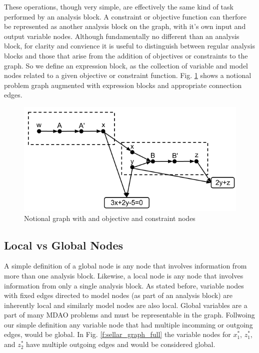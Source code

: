 These operations, though very simple, are effectively the same kind of task 
performed by an analysis block. A constraint or objective function can therfore 
be represented as another analysis block on the graph, with it's own input and 
output variable nodes. Although fundamentally no different than an analysis block, 
for clarity and convience it is useful to distinguish between regular analysis 
blocks and those that arise from the addition of objectives or constraints to 
the graph. So we define an expression block, as the collection of variable and model 
nodes related to a given objective or constraint function. Fig. \ref{f:obj-cons}
shows a notional problem graph augmented with expression blocks and appropriate 
connection edges. 


\begin{figure}[htb!]
  \begin{center}
    \includegraphics[width=.6\textwidth]{images/obj_const_graph}
  \end{center}
  \caption{Notional graph with and objective and constraint nodes \label{f:obj-cons}}
\end{figure}


\subsection{Local vs Global Nodes}

  A simple definition of a global node is any node that involves information 
  from more than one analysis block. Likewise, a local node is any node 
  that involves information from only a single analysis block. As stated before, variable 
  nodes with fixed edges directed to model nodes (as part of an analysis block) are inherently local 
  and similarly model nodes are also local. Global variables are a part of many 
  MDAO problems and must be representable in the graph. Follwoing our simple definition
  any variable node that had multiple incomming or outgoing edges, would be global. 
  In Fig. \ref{f:sellar_graph_full} the variable nodes for $x_1^*$, $z_1^*$, and $z_2^*$ 
  have multiple outgoing edges and would be considered global. 

